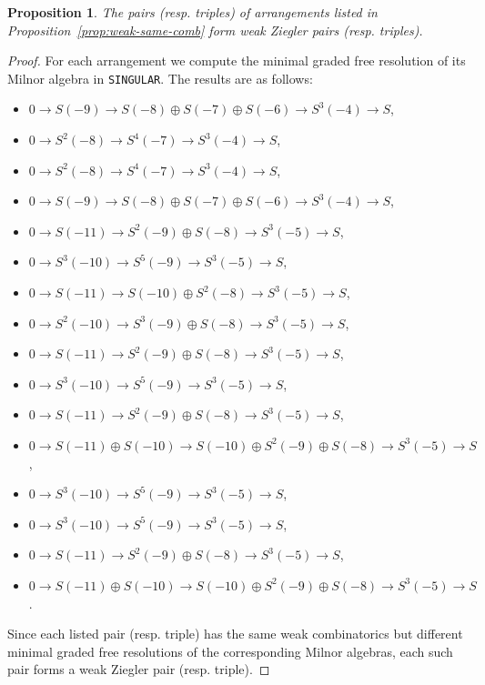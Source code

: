 \documentclass[11pt]{article}
\theoremstyle{plain}
\newtheorem{proposition}[thm]{Proposition}
\theoremstyle{definition}
\renewcommand{\r}{\rightarrow}
\begin{document}
\begin{proposition}\label{prop:weak-ziegler-pairs}
The pairs (resp. triples) of arrangements listed in Proposition~\ref{prop:weak-same-comb} form weak Ziegler pairs (resp. triples).
\end{proposition}
\newpage
\begin{proof}
For each arrangement we compute the minimal graded free resolution of its Milnor algebra in \texttt{SINGULAR}. The results are as follows:

\begin{itemize}[leftmargin=3.5cm, labelsep=0.5cm]
    \item[$\left(W^{2,1}_{4,1}\right)$:] \quad $0\r S(-9)\r S(-8)\oplus S(-7)\oplus S(-6)\r S^3(-4)\r S$,
\item[$\left(W^{2,1}_{4,2}\right)$:] \quad $0\r S^2(-8)\r S^4(-7)\r S^3(-4)\r S$,
    \item[$\left(W^{1,3}_{3,1}\right)$:]
    \quad $0\r S^2(-8)\r S^4(-7)\r S^3(-4)\r S$,
\item[$\left(W^{1,3}_{3,2}\right)$:]
\quad $0\r S(-9)\r S(-8)\oplus S(-7)\oplus S(-6)\r S^3(-4)\r S$,
    \item[$\left(W^{3,0}_{7,1}\right)$:]
    \quad $0\r S(-11)\r S^2(-9)\oplus S(-8)\r S^3(-5) \r S$,
\item[$\left(W^{3,0}_{7,2}\right)$:]
\quad $0\r S^3(-10)\r S^5(-9)\r S^3(-5)\r S$, 
\item[$\left(W^{3,0}_{14,1}\right)$:]
\quad $0\r S(-11)\r S(-10)\oplus S^2(-8)\r S^3(-5)\r S$,
\item[$\left(W^{3,0}_{14,2}\right)$:]
\quad $0\r S^2(-10)\r S^3(-9)\oplus S(-8)\r S^3(-5)\r S$,
\item[$\left(W^{1,4}_{3,1}\right)$:]
\quad $0\r S(-11)\r S^2(-9)\oplus S(-8)\r S^3(-5)\r S$,
\item[$\left(W^{1,4}_{3,2}\right)$:]
\quad $0\r S^3(-10)\r S^5(-9)\r S^3(-5)\r S$, 
\item[$\left(W^{2,2}_{4,1}\right)$:]
\quad $0\r S(-11)\r S^2(-9)\oplus S(-8)\r S^3(-5)\r S$,
\item[$\left(W^{2,2}_{4,2}\right)$:]
\quad $0\r S(-11)\oplus S(-10)\r S(-10)\oplus S^2(-9)\oplus S(-8)\r S^3(-5)\r S$,
\item[$\left(W^{2,2}_{4,3}\right)$:]
\quad $0\r S^3(-10)\r S^5(-9)\r S^3(-5)\r S$, 
\item[$\left(W^{2,2}_{5,1}\right)$:]
\quad $0\r S^3(-10)\r S^5(-9)\r S^3(-5)\r S$,
\item[$\left(W^{2,2}_{5,2}\right)$:]
\quad $0\r S(-11)\r S^2(-9)\oplus S(-8)\r S^3(-5)\r S$,
\item[$\left(W^{2,2}_{5,3}\right)$:]
\quad $0\r S(-11)\oplus S(-10)\r S(-10)\oplus S^2(-9)\oplus S(-8)\r S^3(-5)\r S$.

\end{itemize}

\noindent
    Since each listed pair (resp. triple) has the same weak combinatorics but different minimal graded free resolutions of the corresponding Milnor algebras, each such pair forms a weak Ziegler pair (resp. triple).
\end{proof}
\end{document}
